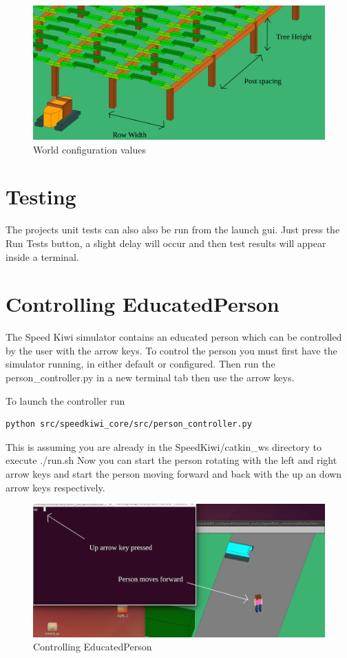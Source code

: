 \documentclass{article}
\begin{document}
\begin{figure}[ht]\centering
\includegraphics[scale=0.35]{config2}
\caption{World configuration values}
\label{fig:results}
\end{figure}


\section{Testing}

The projects unit tests can also also be run from the launch gui. Just press the Run Tests button, a slight delay will occur and then test results will appear inside a terminal.

\section{Controlling EducatedPerson}

The Speed Kiwi simulator contains an educated person which can be controlled by the user with the arrow keys.
To control the person you must first have the simulator running, in either default or configured.
Then run the person\_controller.py in a new terminal tab then use the arrow keys.

To launch the controller run
\begin{verbatim}
python src/speedkiwi_core/src/person_controller.py
\end{verbatim}

This is assuming you are already in the SpeedKiwi/catkin\_ws directory to execute ./run.sh
Now you can start the person rotating with the left and right arrow keys and start the person moving forward and back with the up an down arrow keys respectively.

\begin{figure}[ht]\centering
\includegraphics[scale=0.45]{control}
\caption{Controlling EducatedPerson}
\label{fig:results}
\end{figure}
\end{document}
